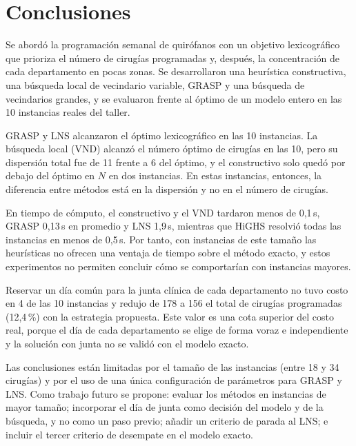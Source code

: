 \section{Conclusiones}
\label{sec:conclusion}


Se abordó la programación semanal de quirófanos con un objetivo lexicográfico que prioriza el número de cirugías programadas y, después, la concentración de cada departamento en pocas zonas. Se desarrollaron una heurística constructiva, una búsqueda local de vecindario variable, GRASP y una búsqueda de vecindarios grandes, y se evaluaron frente al óptimo de un modelo entero en las 10 instancias reales del taller.

GRASP y LNS alcanzaron el óptimo lexicográfico en las 10 instancias. La búsqueda local (VND) alcanzó el número óptimo de cirugías en las 10, pero su dispersión total fue de 11 frente a 6 del óptimo, y el constructivo solo quedó por debajo del óptimo en $N$ en dos instancias. En estas instancias, entonces, la diferencia entre métodos está en la dispersión y no en el número de cirugías.

En tiempo de cómputo, el constructivo y el VND tardaron menos de 0,1\,s, GRASP 0,13\,s en promedio y LNS 1,9\,s, mientras que HiGHS resolvió todas las instancias en menos de 0,5\,s. Por tanto, con instancias de este tamaño las heurísticas no ofrecen una ventaja de tiempo sobre el método exacto, y estos experimentos no permiten concluir cómo se comportarían con instancias mayores.

Reservar un día común para la junta clínica de cada departamento no tuvo costo en 4 de las 10 instancias y redujo de 178 a 156 el total de cirugías programadas (12,4\,\%) con la estrategia propuesta. Este valor es una cota superior del costo real, porque el día de cada departamento se elige de forma voraz e independiente y la solución con junta no se validó con el modelo exacto.

Las conclusiones están limitadas por el tamaño de las instancias (entre 18 y 34 cirugías) y por el uso de una única configuración de parámetros para GRASP y LNS. Como trabajo futuro se propone: evaluar los métodos en instancias de mayor tamaño; incorporar el día de junta como decisión del modelo y de la búsqueda, y no como un paso previo; añadir un criterio de parada al LNS; e incluir el tercer criterio de desempate en el modelo exacto.
